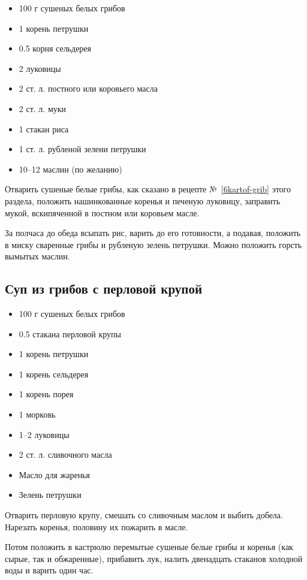 \begin{itemize}
	\item 100 г сушеных белых грибов
    \item 1 корень петрушки 
    \item 0.5 корня сельдерея 
    \item 2 луковицы 
    \item 2 ст. л. постного или коровьего масла
    \item 2 ст. л. муки 
    \item 1 стакан риса 
    \item 1 ст. л. рубленой зелени петрушки 
    \item 10–12 маслин (по желанию)
\end{itemize}

Отварить сушеные белые грибы, как сказано в рецепте №~\ref{6kartof-grib} этого раздела, положить нашинкованные коренья и печеную луковицу, заправить мукой, вскипяченной в постном или коровьем масле.

За полчаса до обеда всыпать рис, варить до его готовности, а подавая, положить в миску сваренные грибы и рубленую зелень петрушки. Можно положить горсть вымытых маслин.

\subsection{Суп из грибов с перловой крупой}\label{17sup-grib-perl}

\begin{itemize}
	\item 100 г сушеных белых грибов 
    \item 0.5 стакана перловой крупы
    \item 1 корень петрушки
    \item 1 корень сельдерея
    \item 1 корень порея
    \item 1 морковь
    \item 1–2 луковицы
    \item 2 ст. л. сливочного масла
    \item Масло для жаренья
    \item Зелень петрушки
\end{itemize}

Отварить перловую крупу, смешать со сливочным маслом и выбить добела. Нарезать коренья, половину их пожарить в масле.

Потом положить в кастрюлю перемытые сушеные белые грибы и коренья (как сырые, так и обжаренные), прибавить лук, налить двенадцать стаканов холодной воды и варить один час.

